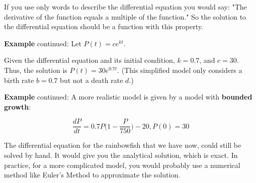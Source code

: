 \begin{paracol}{2}
\switchcolumn

If you use only words to describe the differential equation you would say: "The derivative of the function equals a multiple of the function." So the solution to the differential equation should be a function with this property.

\textbf{Example} continued: Let $P(t) = c e^{kt}$.

Given the differential equation and its initial condition, $k = 0.7$, and $c = 30$. Thus, the solution is $P(t) = 30 e^{0.7 t}$. (This simplified model only considers a birth rate $b = 0.7$ but not a death rate $d$.)

\textbf{Example} continued: A more realistic model is given by a model with \textbf{bounded growth}:

$$\frac{dP}{dt} = 0.7 P \Big(1 - \frac{P}{750} \Big) - 20, P(0) = 30$$

The differential equation for the rainbowfish that we have now, could still be solved by hand. It would give you the analytical solution, which is exact. In practice, for a more complicated model, you would probably use a numerical method like Euler's Method to approximate the solution.


\end{paracol}
